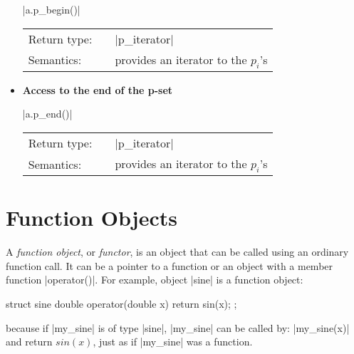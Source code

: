 \documentclass[12pt,twoside]{report}
\begin{document}
\begin{itemize}
  |a.p_begin()|

  \begin{tabular}[!h]{l p{1cm} p{10cm}}
    Return type: & & |p_iterator|\\
    Semantics: & & provides an iterator to the $p_i$'s\\
  \end{tabular}
 
\item {\bf Access to the end of the p-set}
  
  |a.p_end()|

  \begin{tabular}[!h]{l p{1cm} p{10cm}}
    Return type: & & |p_iterator|\\
    Semantics: & & provides an iterator to the $p_i$'s\\
  \end{tabular}
 
%               
%               
\end{itemize}







\section{Function Objects}

A \emph{function object}, or \emph{functor}, is an object that can be called using an ordinary function call. It can be a pointer to a function or an object with a member function |operator()|. 
For example, object |sine| is a function object:
\begin{code}
struct sine{
  double operator(double x) {return sin(x);}
};
\end{code}
\noindent because if |my_sine| is of type |sine|, |my_sine| can be called by: |my_sine(x)| and return $sin(x)$, just as if |my_sine| was a function.
\end{document}
